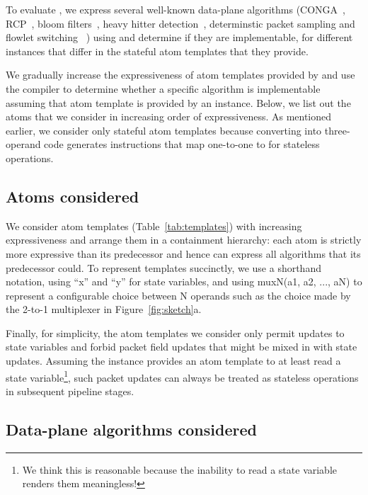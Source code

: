 To evaluate \pktlanguage, we express several well-known data-plane algorithms
(CONGA~\cite{conga}, RCP~\cite{rcp}, bloom filters~\cite{bloom}, heavy hitter
detection~\cite{opensketch}, determinstic packet sampling and flowlet switching
~\cite{flowlets}) using \pktlanguage and determine if they are implementable,
for different \absmachine instances that differ in the stateful atom templates
that they provide.

We gradually increase the expressiveness of atom templates provided by
\pktlanguage and use the \pktlanguage compiler to determine whether a specific
algorithm is implementable assuming that atom template is provided by an
\absmachine instance. Below, we list out the atoms that we consider in
increasing order of expressiveness. As mentioned earlier, we consider only
stateful atom templates because converting into three-operand code generates
instructions that map one-to-one to \absmachine for stateless operations.

\subsection{Atoms considered}

We consider atom templates (Table~\ref{tab:templates}) with increasing
expressiveness and arrange them in a containment hierarchy: each atom is
strictly more expressive than its predecessor and hence can express all
algorithms that its predecessor could. To represent templates succinctly, we
use a shorthand notation, using ``x'' and ``y'' for state variables, and using
muxN(a1, a2, ..., aN) to represent a configurable choice between N operands
such as the choice made by the 2-to-1 multiplexer in Figure~\ref{fig:sketch}a.

Finally, for simplicity, the atom templates we consider only permit updates to
state variables and forbid packet field updates that might be mixed in with
state updates. Assuming the \absmachine instance provides an atom template to
at least read a state variable\footnote{We think this is reasonable because the
inability to read a state variable renders them meaningless!}, such packet
updates can always be treated as stateless operations in subsequent pipeline
stages.

\subsection{Data-plane algorithms considered}


